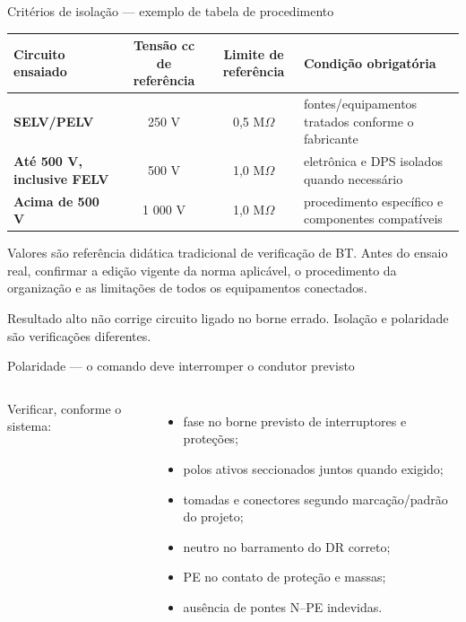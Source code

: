 \begin{frame}{Critérios de isolação — exemplo de tabela de procedimento}
\scriptsize
\begin{tabularx}{\textwidth}{>{\bfseries}p{3.1cm}c c X}
\toprule
Circuito ensaiado & Tensão cc de referência & Limite de referência & Condição obrigatória \\
\midrule
SELV/PELV & 250 V & 0,5 M$\Omega$ & fontes/equipamentos tratados conforme o fabricante \\
Até 500 V, inclusive FELV & 500 V & 1,0 M$\Omega$ & eletrônica e DPS isolados quando necessário \\
Acima de 500 V & 1 000 V & 1,0 M$\Omega$ & procedimento específico e componentes compatíveis \\
\bottomrule
\end{tabularx}
\begin{caixaNorma}[title=Como usar esta tabela]
Valores são referência didática tradicional de verificação de BT. Antes do ensaio real, confirmar a edição vigente da norma aplicável, o procedimento da organização e as limitações de todos os equipamentos conectados.
\end{caixaNorma}
\begin{caixaAt}
Resultado alto não corrige circuito ligado no borne errado. Isolação e polaridade são verificações diferentes.
\end{caixaAt}
\end{frame}

\begin{frame}{Polaridade — o comando deve interromper o condutor previsto}
\small
\begin{columns}[T,onlytextwidth]
Verificar, conforme o sistema:
\begin{itemize}
\item fase no borne previsto de interruptores e proteções;
\item polos ativos seccionados juntos quando exigido;
\item tomadas e conectores segundo marcação/padrão do projeto;
\item neutro no barramento do DR correto;
\item PE no contato de proteção e massas;
\item ausência de pontes N--PE indevidas.
\end{itemize}
\end{columns}
\end{frame}

